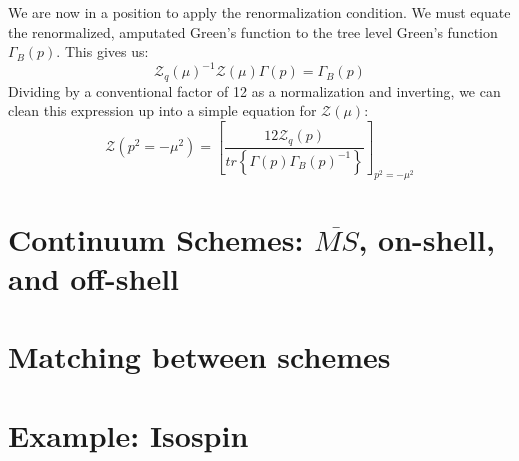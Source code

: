 \documentclass[11pt, oneside]{article}   	%
\theoremstyle{definition}
\begin{document}
We are now in a position to apply the renormalization condition. We must equate the renormalized, amputated Green's function to the 
tree level Green's function $\Gamma_B(p)$. This gives us:
\begin{equation}
	\mathcal Z_q(\mu)^{-1}\mathcal Z(\mu) \Gamma(p) = \Gamma_B(p)
\end{equation}
Dividing by a conventional factor of 12 as a normalization and inverting, we can clean this expression up into a simple equation for $\mathcal Z(\mu)$:
\begin{equation}
	\mathcal Z(p^2 = -\mu^2) = \left[\frac{12\mathcal Z_q(p)}{tr\left\{\Gamma(p)\Gamma_B(p)^{-1}\right\}}\right]_{p^2 = -\mu^2}
\end{equation}

\section{Continuum Schemes: $\overline{MS}$, on-shell, and off-shell}

\section{Matching between schemes}

\section{Example: Isospin}
\end{document}
